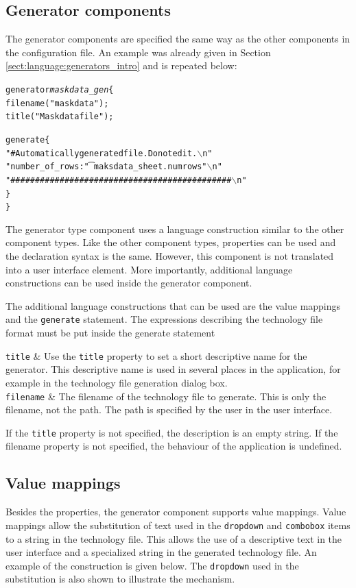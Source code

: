 \subsection{Generator components} \label{sect:language:generator_components}
The generator components are specified the same way as the other components in
the configuration file. An example was already given in Section
\ref{sect:language:generators_intro} and is repeated below:
\begin{alltt}
generator \emph{maskdata_gen} \{
    filename("maskdata");
    title("Maskdata file");

    generate \{
        "# Automatically generated file. Do not edit.\(\backslash\)n"
        "number_of_rows:\t" maksdata_sheet.numrows "\(\backslash\)n"
        "#############################################\(\backslash\)n"
    \}
\}
\end{alltt}
The generator type component uses a language construction similar to the other
component types. Like the other component types, properties can be used and the
declaration syntax is the same. However, this component is not translated into
a user interface element. More importantly, additional language constructions
can be used inside the generator component.

The additional language constructions that can be used are the value mappings
and the \verb=generate= statement. The expressions describing the technology
file format must be put inside the generate statement

\begin{PropTable}
 \verb=title=       & Use the \verb=title= property to set a short descriptive name
                      for the generator. This descriptive name is used in several places in the application, for example in the technology file generation dialog box.\\
 \verb=filename=    & The filename of the technology file to generate. This is
                      only the filename, not the path. The path is specified by
                      the user in the user interface.
\end{PropTable}

If the \verb=title= property is not specified, the description is an empty
string. If the filename property is not specified, the behaviour of the
application is undefined.

\subsection{Value mappings}\label{sect:language:valmaps}
Besides the properties, the generator component supports value mappings. Value
mappings allow the substitution of text used in the \verb=dropdown= and
\verb=combobox= items to a string in the technology file. This allows the use
of a descriptive text in the user interface and a specialized string in the
generated technology file. An example of the construction is given below. The
\verb=dropdown= used in the substitution is also shown to illustrate the
mechanism.

